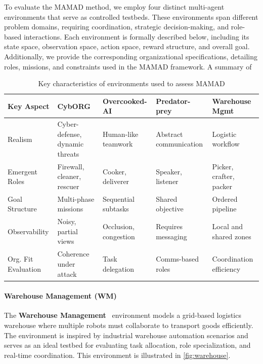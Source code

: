 \documentclass[pdflatex,sn-mathphys-num]{sn-jnl}%
\theoremstyle{thmstyleone}%
\theoremstyle{thmstyletwo}%
\theoremstyle{thmstylethree}%
\begin{document}
To evaluate the MAMAD method, we employ four distinct multi-agent environments that serve as controlled testbeds. These environments span different problem domains, requiring coordination, strategic decision-making, and role-based interactions. Each environment is formally described below, including its state space, observation space, action space, reward structure, and overall goal. Additionally, we provide the corresponding organizational specifications, detailing roles, missions, and constraints used in the MAMAD framework. A summary of 

\begin{table}[h!]
    \centering
    \begin{footnotesize}
        \renewcommand{\arraystretch}{1.3}
        \begin{tabular}{p{2cm}p{2.2cm}p{2.2cm}p{2.2cm}p{2.2cm}}
            \hline
            \textbf{Key Aspect} & \textbf{CybORG}                & \textbf{Overcooked-AI} & \textbf{Predator-prey} & \textbf{Warehouse Mgmt} \\ \hline
            Realism             & Cyber-defense, dynamic threats & Human-like teamwork    & Abstract communication & Logistic workflow       \\ \hline
            Emergent Roles      & Firewall, cleaner, rescuer     & Cooker, deliverer      & Speaker, listener      & Picker, crafter, packer \\ \hline
            Goal Structure      & Multi-phase missions           & Sequential subtasks    & Shared objective       & Ordered pipeline        \\ \hline
            Observability       & Noisy, partial views           & Occlusion, congestion  & Requires messaging     & Local and shared zones  \\ \hline
            Org. Fit Evaluation & Coherence under attack         & Task delegation        & Comms-based roles      & Coordination efficiency \\ \hline
        \end{tabular}
        \caption{Key characteristics of environments used to assess MAMAD}
        \label{tab:mamad_env_characteristics}
    \end{footnotesize}
\end{table}


\paragraph{Warehouse Management (WM)}
The \textbf{Warehouse Management}~\cite{warehouse_management} environment models a grid-based logistics warehouse where multiple robots must collaborate to transport goods efficiently. The environment is inspired by industrial warehouse automation scenarios and serves as an ideal testbed for evaluating task allocation, role specialization, and real-time coordination. This environment is illustrated in \autoref{fig:warehouse}.
\end{document}
